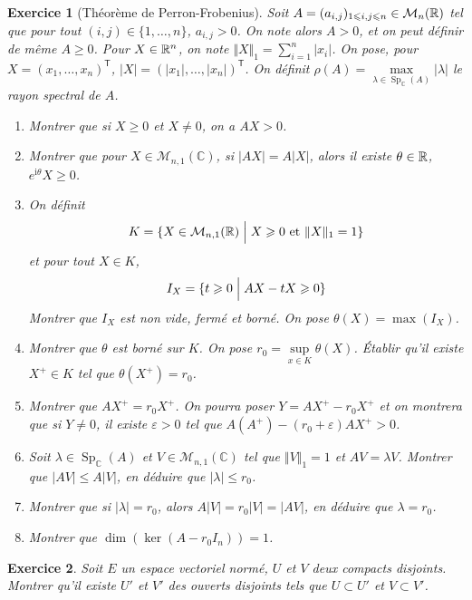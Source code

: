 \documentclass[12pt]{article}
\newtheorem{exercise}{Exercice}[section]
\theoremstyle{remark}
\theoremstyle{remark}
\newcommand{\C}{\mathbb{C}} \newcommand{\Q}{\mathbb{Q}}
\newcommand{\M}{\mathcal{M}} \renewcommand{\L}{\mathcal{L}}
\DeclareMathOperator{\Sp}{Sp} \DeclareMathOperator{\mat}{mat}
\begin{document}
\begin{exercise}[Théorème de Perron-Frobenius]
	Soit $A=(a_{i,j})_{1\leqslant i,j\leqslant n}\in\M_{n}(\R)$ tel que pour tout $(i,j)\in\{1,\dots,n\}$, $a_{i,j}>0$. On note alors $A>0$, et on peut définir de même $A\geqslant0$. Pour $X\in\mathbb{R}^{n}$, on note $\Vert X\Vert_{1}=\sum_{i=1}^{n}\vert x_{i}\vert$. On pose, pour $X=(x_{1},\dots,x_{n})^{\mathsf{T}}$, $\vert X\vert=(\vert x_{1}\vert,\dots,\vert x_{n}\vert)^{\mathsf{T}}$. 
	On définit $\rho(A)=\max\limits_{\lambda\in\Sp_{\C}(A)}\vert\lambda\vert$ le rayon spectral de $A$.
	\begin{enumerate}
		\item Montrer que si $X\geqslant0$ et $X\neq0$, on a $AX>0$.
		\item Montrer que pour $X\in\M_{n,1}(\C)$, si $\vert AX\vert=A\vert X\vert$, alors il existe $\theta\in\mathbb{R}$, $e^{\mathrm{i}\theta}X\geqslant0$.
		\item On définit 
		$$K=\{X\in\M_{n,1}(\R)\Bigm| X\geqslant0\text{ et }\Vert X\Vert_{1}=1\}$$
		et pour tout $X\in K$, 
		$$I_{X}=\{t\geqslant0\Bigm|AX-tX\geqslant0\}$$
		Montrer que $I_{X}$ est non vide, fermé et borné. On pose $\theta(X)=\max(I_{X})$.
		\item Montrer que $\theta$ est borné sur $K$. On pose $r_{0}=\sup\limits_{x\in K}\theta(X)$. Établir qu'il existe $X^{+}\in K$ tel que $\theta(X^{+})=r_{0}$.
		\item Montrer que $AX^{+}=r_{0}X^{+}$. On pourra poser $Y=AX^{+}-r_{0}X^{+}$ et on montrera que si $Y\neq0$, il existe $\varepsilon>0$ tel que $A(A^{+})-(r_{0}+\varepsilon)AX^{+}>0$.
		\item Soit $\lambda\in\Sp_{\C}(A)$ et $V\in\M_{n,1}(\C)$ tel que $\Vert V\Vert_{1}=1$ et $AV=\lambda V$. Montrer que $\vert AV\vert\leqslant A\vert V\vert$, en déduire que $\vert\lambda\vert\leqslant r_{0}$.
		\item Montrer que si $\vert\lambda\vert=r_{0}$, alors $A\vert V\vert=r_{0}\vert V\vert=\vert AV\vert$, en déduire que $\lambda=r_{0}$.
		\item Montrer que $\dim(\ker(A-r_{0}I_{n}))=1$.
	\end{enumerate}
\end{exercise}

\begin{exercise}
	Soit $E$ un espace vectoriel normé, $U$ et $V$ deux compacts disjoints. Montrer qu'il existe $U'$ et $V'$ des ouverts disjoints tels que $U\subset U'$ et $V\subset V'$.
\end{exercise}
\end{document}
